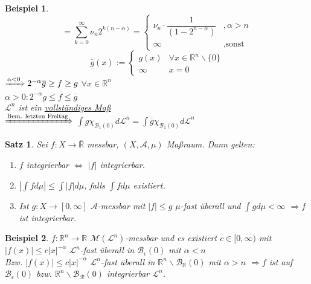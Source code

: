 \documentclass[11pt]{memoir}
\theoremstyle{changebreak}
\newtheorem{Beispiel}{Beispiel}[chapter]
\newtheorem{Satz}{Satz}[chapter]
\begin{document}
\begin{Beispiel}
\begin{equation}
= \sum\limits_{k=0}^\infty  \nu_n 2^{k(n-\alpha)} =
\begin{cases}
	\nu_n \cdotp \dfrac{1}{(1-2^{n-\alpha})} & , \alpha > n \\
	\infty & , \text{sonst}
\end{cases}
\end{equation}
\begin{equation}
\overline{g}(x) :=
\begin{cases}
	g(x) & \forall x \in \mathbb R^n \backslash \{0\} \\
	\infty & x = 0
\end{cases}
\end{equation}
$\xRightarrow{\alpha < 0} 2^{-\alpha}\overline{g} \geq f \geq g$ $\forall x \in \mathbb R^n$ \\
$\alpha > 0: 2^{-\alpha}g \leq f \leq \overline g$ \\
$\mathscr L^n$ ist ein \underline{vollständiges Maß} \\
$\xRightarrow{\text{Bem. letzten Freitag}}$ $\int g \chi_{\mathscr B_1 (0)} d\mathscr L^n = \int \overline g \chi_{\mathscr B_1(0)} d\mathscr L^n$
\end{Beispiel}

\begin{Satz}
Sei $f: X \rightarrow \overline{\mathbb R}$ messbar, $(X, \mathscr A, \mu)$ Maßraum. Dann gelten:
\begin{enumerate}
	\item $f$ integrierbar $\Leftrightarrow$ $|f|$ integrierbar.
	\item $\left| \int f d\mu \right| \leq \int |f| d\mu$, falls $\int f d\mu$ existiert.
	\item Ist $g: X \rightarrow [0, \infty]$ $\mathscr A$-messbar mit $|f| \leq g$ $\mu$-fast überall und $\int g d\mu < \infty$ $\Rightarrow f$ ist integrierbar.
\end{enumerate}
\end{Satz}

\begin{Beispiel}
$f: \mathbb R^n \rightarrow \mathbb R$ $\mathscr M(\mathscr L^n)$-messbar und es existiert $c \in [0, \infty)$ mit $|f(x)| \leq c|x|^{-\alpha}$ $\mathscr L^n$-fast überall in $\mathscr B_\epsilon (0)$ mit $\alpha < n$ \\
Bzw. $|f(x)| \leq c|x|^{-\alpha}$ $\mathscr L^n$-fast überall in $\mathbb R^n \backslash \mathscr B_\mathbb R (0)$ mit $\alpha > n$ $\Rightarrow f$ ist auf $\mathscr B_\epsilon (0)$ bzw. $\mathbb R^n \backslash \mathscr B_\mathscr R (0)$ integrierbar $\mathscr L^n$.
\end{Beispiel}
\end{document}
